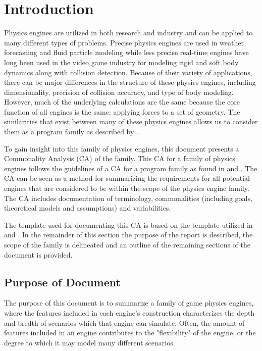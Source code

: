 \documentclass{article}
\begin{document}
\newpage

\section{Introduction}
Physics engines are utilized in both research and industry and can be applied to many different types of problems. Precise physics engines are used in weather forecasting and fluid particle modeling while less precise real-time engines have long been used in the video game industry for modeling rigid and soft body dynamics along with collision detection. Because of their variety of applications, there can be major differences in the structure of these physics engines, including dimensionality, precision of collision accuracy, and type of body modeling. However, much of the underlying calculations are the same because the core function of all engines is the same: applying forces to a set of geometry. The similarities that exist between many of these physics engines allows us to consider them as a program family as described by \cite{SmithMcCutchanAndCao2007}.
\par
To gain insight into this family of physics engines, this document presents
a Commonality Analysis (CA) of the family. This CA for a family of physics engines follows the guidelines of a CA for a program family as found in \cite{CukaAndWeiss1997} and \cite{WeissAndLai1999}. The CA can be seen as a method for summarizing the requirements for all potential engines that are considered to be within the scope of the physics engine family. The CA includes documentation of terminology, commonalities (including goals, theoretical models and assumptions) and variabilities.
\par
The template used for documenting this CA is based on the template utilized in \cite{SmithMcCutchanAndCarette2014} and \cite{SmithAndChen2004b}. In the remainder of this section the purpose of the report is described, the scope of the family is delineated and an outline of the remaining sections of the document is provided.

\subsection{Purpose of Document}
The purpose of this document is to summarize a family of game physics engines, where the features included in each engine's construction characterizes the depth and bredth of scenarios which that engine can simulate. Often, the amount of features included in an engine contributes to the "flexibility" of the engine, or the degree to which it may model many different scenarios.
\end{document}
